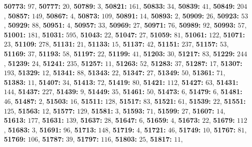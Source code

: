 \textsf{\bfseries 50773:} $97$, \textsf{\bfseries 50777:} $20$, \textsf{\bfseries 50789:} $3$, \textsf{\bfseries 50821:} $161$, \textsf{\bfseries 50833:} $34$, \textsf{\bfseries 50839:} $41$, \textsf{\bfseries 50849:} $204$, \textsf{\bfseries 50857:} $149$, \textsf{\bfseries 50867:} $4$, \textsf{\bfseries 50873:} $109$, \textsf{\bfseries 50891:} $14$, \textsf{\bfseries 50893:} $2$, \textsf{\bfseries 50909:} $26$, \textsf{\bfseries 50923:} $53$, \textsf{\bfseries 50929:} $88$, \textsf{\bfseries 50951:} $4$, \textsf{\bfseries 50957:} $33$, \textsf{\bfseries 50969:} $27$, \textsf{\bfseries 50971:} $76$, \textsf{\bfseries 50989:} $92$, \textsf{\bfseries 50993:} $57$, \textsf{\bfseries 51001:} $181$, \textsf{\bfseries 51031:} $595$, \textsf{\bfseries 51043:} $22$, \textsf{\bfseries 51047:} $27$, \textsf{\bfseries 51059:} $81$, \textsf{\bfseries 51061:} $122$, \textsf{\bfseries 51071:} $23$, \textsf{\bfseries 51109:} $278$, \textsf{\bfseries 51131:} $21$, \textsf{\bfseries 51133:} $15$, \textsf{\bfseries 51137:} $42$, \textsf{\bfseries 51151:} $237$, \textsf{\bfseries 51157:} $53$, \textsf{\bfseries 51169:} $37$, \textsf{\bfseries 51193:} $58$, \textsf{\bfseries 51197:} $22$, \textsf{\bfseries 51199:} $41$, \textsf{\bfseries 51203:} $30$, \textsf{\bfseries 51217:} $83$, \textsf{\bfseries 51229:} $244$, \textsf{\bfseries 51239:} $24$, \textsf{\bfseries 51241:} $235$, \textsf{\bfseries 51257:} $11$, \textsf{\bfseries 51263:} $52$, \textsf{\bfseries 51283:} $37$, \textsf{\bfseries 51287:} $17$, \textsf{\bfseries 51307:} $193$, \textsf{\bfseries 51329:} $12$, \textsf{\bfseries 51341:} $88$, \textsf{\bfseries 51343:} $22$, \textsf{\bfseries 51347:} $27$, \textsf{\bfseries 51349:} $50$, \textsf{\bfseries 51361:} $71$, \textsf{\bfseries 51383:} $11$, \textsf{\bfseries 51407:} $34$, \textsf{\bfseries 51413:} $72$, \textsf{\bfseries 51419:} $80$, \textsf{\bfseries 51421:} $112$, \textsf{\bfseries 51427:} $63$, \textsf{\bfseries 51431:} $144$, \textsf{\bfseries 51437:} $227$, \textsf{\bfseries 51439:} $9$, \textsf{\bfseries 51449:} $35$, \textsf{\bfseries 51461:} $50$, \textsf{\bfseries 51473:} $6$, \textsf{\bfseries 51479:} $6$, \textsf{\bfseries 51481:} $46$, \textsf{\bfseries 51487:} $2$, \textsf{\bfseries 51503:} $16$, \textsf{\bfseries 51511:} $128$, \textsf{\bfseries 51517:} $83$, \textsf{\bfseries 51521:} $61$, \textsf{\bfseries 51539:} $22$, \textsf{\bfseries 51551:} $125$, \textsf{\bfseries 51563:} $12$, \textsf{\bfseries 51577:} $129$, \textsf{\bfseries 51581:} $3$, \textsf{\bfseries 51593:} $71$, \textsf{\bfseries 51599:} $27$, \textsf{\bfseries 51607:} $14$, \textsf{\bfseries 51613:} $177$, \textsf{\bfseries 51631:} $139$, \textsf{\bfseries 51637:} $28$, \textsf{\bfseries 51647:} $6$, \textsf{\bfseries 51659:} $4$, \textsf{\bfseries 51673:} $22$, \textsf{\bfseries 51679:} $112$, \textsf{\bfseries 51683:} $3$, \textsf{\bfseries 51691:} $96$, \textsf{\bfseries 51713:} $148$, \textsf{\bfseries 51719:} $4$, \textsf{\bfseries 51721:} $46$, \textsf{\bfseries 51749:} $10$, \textsf{\bfseries 51767:} $81$, \textsf{\bfseries 51769:} $106$, \textsf{\bfseries 51787:} $39$, \textsf{\bfseries 51797:} $116$, \textsf{\bfseries 51803:} $25$, \textsf{\bfseries 51817:} $11$, 
